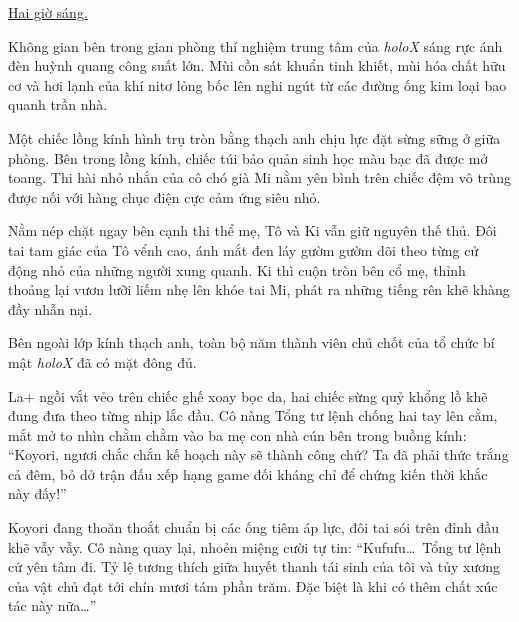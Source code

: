 \documentclass[../main.tex]{subfiles}
\begin{document}

\begin{center}
    \uline{Hai giờ sáng.}
\end{center}

Không gian bên trong gian phòng thí nghiệm trung tâm của \textit{holoX} sáng rực ánh đèn huỳnh quang công suất lớn. Mùi cồn sát khuẩn tinh khiết, mùi hóa chất hữu cơ và hơi lạnh của khí nitơ lỏng bốc lên nghi ngút từ các đường ống kim loại bao quanh trần nhà.

Một chiếc lồng kính hình trụ tròn bằng thạch anh chịu lực đặt sừng sững ở giữa phòng. Bên trong lồng kính, chiếc túi bảo quản sinh học màu bạc đã được mở toang. Thi hài nhỏ nhắn của cô chó già Mi nằm yên bình trên chiếc đệm vô trùng được nối với hàng chục điện cực cảm ứng siêu nhỏ.

Nằm nép chặt ngay bên cạnh thi thể mẹ, Tô và Ki vẫn giữ nguyên thế thủ. Đôi tai tam giác của Tô vểnh cao, ánh mắt đen láy gườm gườm dõi theo từng cử động nhỏ của những người xung quanh. Ki thì cuộn tròn bên cổ mẹ, thỉnh thoảng lại vươn lưỡi liếm nhẹ lên khóe tai Mi, phát ra những tiếng rên khẽ khàng đầy nhẫn nại.

Bên ngoài lớp kính thạch anh, toàn bộ năm thành viên chủ chốt của tổ chức bí mật \textit{holoX} đã có mặt đông đủ.

La+ ngồi vắt vẻo trên chiếc ghế xoay bọc da, hai chiếc sừng quỷ khổng lồ khẽ đung đưa theo từng nhịp lắc đầu. Cô nàng Tổng tư lệnh chống hai tay lên cằm, mắt mở to nhìn chằm chằm vào ba mẹ con nhà cún bên trong buồng kính: ``Koyori, ngươi chắc chắn kế hoạch này sẽ thành công chứ? Ta đã phải thức trắng cả đêm, bỏ dở trận đấu xếp hạng game đối kháng chỉ để chứng kiến thời khắc này đấy!''

Koyori đang thoăn thoắt chuẩn bị các ống tiêm áp lực, đôi tai sói trên đỉnh đầu khẽ vẫy vẫy. Cô nàng quay lại, nhoẻn miệng cười tự tin: ``Kufufu\dots\ Tổng tư lệnh cứ yên tâm đi. Tỷ lệ tương thích giữa huyết thanh tái sinh của tôi và tủy xương của vật chủ đạt tới chín mươi tám phần trăm. Đặc biệt là khi có thêm chất xúc tác này nữa\dots''
\end{document}
